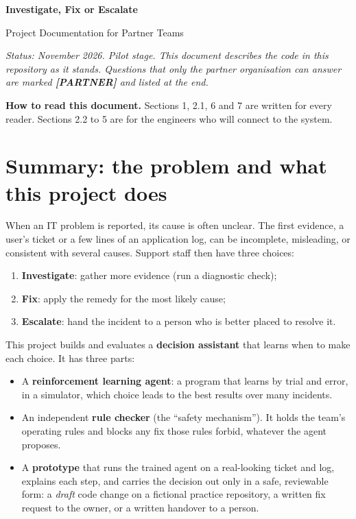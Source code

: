 \documentclass[11pt,a4paper]{article}
\newcommand{\partner}{\textbf{[PARTNER]}}
\begin{document}
\begin{center}
{\LARGE\bfseries Investigate, Fix or Escalate\par}
\vspace{0.3cm}
{\Large Project Documentation for Partner Teams\par}
\vspace{0.5cm}
\end{center}

\emph{Status: November 2026. Pilot stage. This document describes the code in this repository as
it stands. Questions that only the partner organisation can answer are marked \partner{} and
listed at the end.}

\textbf{How to read this document.} Sections 1, 2.1, 6 and 7 are written for every reader.
Sections 2.2 to 5 are for the engineers who will connect to the system.

\tableofcontents

\section{Summary: the problem and what this project does}

When an IT problem is reported, its cause is often unclear. The first evidence, a user's ticket
or a few lines of an application log, can be incomplete, misleading, or consistent with several
causes. Support staff then have three choices:

\begin{enumerate}
\item \textbf{Investigate}: gather more evidence (run a diagnostic check);
\item \textbf{Fix}: apply the remedy for the most likely cause;
\item \textbf{Escalate}: hand the incident to a person who is better placed to resolve it.
\end{enumerate}

This project builds and evaluates a \textbf{decision assistant} that learns when to make each
choice. It has three parts:

\begin{itemize}
\item A \textbf{reinforcement learning agent}: a program that learns by trial and error, in a
  simulator, which choice leads to the best results over many incidents.
\item An independent \textbf{rule checker} (the ``safety mechanism''). It holds the team's
  operating rules and blocks any fix those rules forbid, whatever the agent proposes.
\item A \textbf{prototype} that runs the trained agent on a real-looking ticket and log, explains
  each step, and carries the decision out only in a safe, reviewable form: a \emph{draft} code
  change on a fictional practice repository, a written fix request to the owner, or a written
  handover to a person.
\end{itemize}
\end{document}
